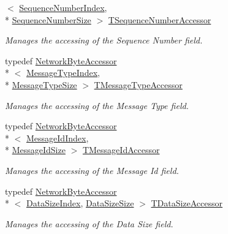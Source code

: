 \begin{DoxyCompactItemize}
$<$ \hyperlink{class_terra_swarm_1_1_message_header_a2a96f83a96cfee0465da982814cb372aa56286e86c6b2fb61f58f34c4fed8c28e}{Sequence\-Number\-Index}, \\*
\hyperlink{class_terra_swarm_1_1_message_header_a189acad5bd9f60fe47b3381da62d3484ab930e6de45a4e449f3a576e38ba4d3a5}{Sequence\-Number\-Size} $>$ \hyperlink{class_terra_swarm_1_1_message_header_afd4ad43e1cb866a290b7d124af9661f6}{T\-Sequence\-Number\-Accessor}
\begin{DoxyCompactList}\small\item\em Manages the accessing of the Sequence Number field. \end{DoxyCompactList}\item 
typedef \hyperlink{class_terra_swarm_1_1_network_byte_accessor}{Network\-Byte\-Accessor}\\*
$<$ \hyperlink{class_terra_swarm_1_1_message_header_a2a96f83a96cfee0465da982814cb372aa636e016fbe208240bd9d92af77fd747a}{Message\-Type\-Index}, \\*
\hyperlink{class_terra_swarm_1_1_message_header_a189acad5bd9f60fe47b3381da62d3484ad45da22415ac87cda0dc06e3e6047947}{Message\-Type\-Size} $>$ \hyperlink{class_terra_swarm_1_1_message_header_ae21a1eeb66f61c557c12f05440aa6f5b}{T\-Message\-Type\-Accessor}
\begin{DoxyCompactList}\small\item\em Manages the accessing of the Message Type field. \end{DoxyCompactList}\item 
typedef \hyperlink{class_terra_swarm_1_1_network_byte_accessor}{Network\-Byte\-Accessor}\\*
$<$ \hyperlink{class_terra_swarm_1_1_message_header_a2a96f83a96cfee0465da982814cb372aa683b7a06a5ebe8befe0dcae6701c3003}{Message\-Id\-Index}, \\*
\hyperlink{class_terra_swarm_1_1_message_header_a189acad5bd9f60fe47b3381da62d3484a9008a5ec8c433f7c7f74c1c150581ea2}{Message\-Id\-Size} $>$ \hyperlink{class_terra_swarm_1_1_message_header_a269de9ac839cc588d65fad2e27f6dcbb}{T\-Message\-Id\-Accessor}
\begin{DoxyCompactList}\small\item\em Manages the accessing of the Message Id field. \end{DoxyCompactList}\item 
typedef \hyperlink{class_terra_swarm_1_1_network_byte_accessor}{Network\-Byte\-Accessor}\\*
$<$ \hyperlink{class_terra_swarm_1_1_message_header_a2a96f83a96cfee0465da982814cb372aa8bf63201f7bd66a6757cefa82db24548}{Data\-Size\-Index}, \hyperlink{class_terra_swarm_1_1_message_header_a189acad5bd9f60fe47b3381da62d3484a3ef403fe13fcd865a980e28ad63dac48}{Data\-Size\-Size} $>$ \hyperlink{class_terra_swarm_1_1_message_header_aed583369adabf273cabc86e379229537}{T\-Data\-Size\-Accessor}
\begin{DoxyCompactList}\small\item\em Manages the accessing of the Data Size field. \end{DoxyCompactList}\end{DoxyCompactItemize}
